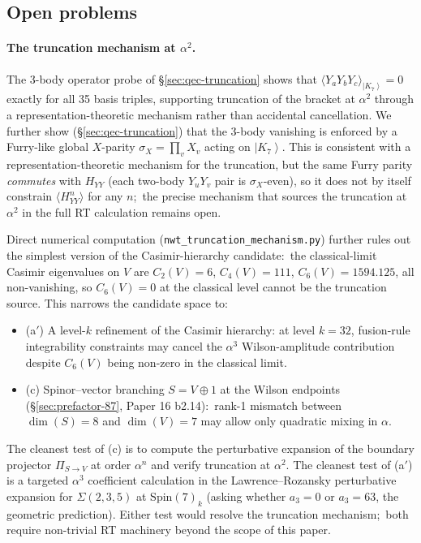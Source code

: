 \documentclass[11pt]{article}
\newcommand{\Spin}{\mathrm{Spin}}
\newcommand{\ket}[1]{\left|#1\right\rangle}
\begin{document}
\subsection{Open problems}
\label{sec:open-problems}

\paragraph{The truncation mechanism at $\alpha^2$.}
The 3-body operator probe of \S\ref{sec:qec-truncation} shows that
$\langle Y_aY_bY_c\rangle_{\ket{K_7}} = 0$ exactly for all 35
basis triples, supporting truncation of the bracket at $\alpha^2$
through a representation-theoretic mechanism rather than accidental
cancellation.  We further show (\S\ref{sec:qec-truncation}) that
the 3-body vanishing is enforced by a Furry-like global $X$-parity
$\sigma_X = \prod_v X_v$ acting on $\ket{K_7}$.  This is consistent
with a representation-theoretic mechanism for the truncation, but
the same Furry parity \emph{commutes} with $H_{YY}$ (each two-body
$Y_uY_v$ pair is $\sigma_X$-even), so it does not by itself constrain
$\langle H_{YY}^n\rangle$ for any $n$;\ the precise mechanism that
sources the truncation at $\alpha^2$ in the full RT calculation
remains open.

Direct numerical computation
(\texttt{nwt\_truncation\_mechanism.py}) further rules out the
simplest version of the Casimir-hierarchy candidate:\ the
classical-limit Casimir eigenvalues on $V$ are $C_2(V) = 6$,
$C_4(V) = 111$, $C_6(V) = 1594.125$, all non-vanishing, so
$C_6(V) = 0$ at the classical level cannot be the truncation
source.  This narrows the candidate space to:

\begin{itemize}
\item (a$'$) A level-$k$ refinement of the Casimir hierarchy: at
  level $k = 32$, fusion-rule integrability constraints may cancel
  the $\alpha^3$ Wilson-amplitude contribution despite $C_6(V)$
  being non-zero in the classical limit.
\item (c) Spinor--vector branching $S = V \oplus 1$ at the Wilson
  endpoints (\S\ref{sec:prefactor-87}, Paper 16 b2.14):\ rank-1
  mismatch between $\dim(S) = 8$ and $\dim(V) = 7$ may allow only
  quadratic mixing in $\alpha$.
\end{itemize}

\noindent
The cleanest test of (c) is to compute the perturbative expansion of
the boundary projector $\Pi_{S\to V}$ at order $\alpha^n$ and verify
truncation at $\alpha^2$.  The cleanest test of (a$'$) is a targeted
$\alpha^3$ coefficient calculation in the Lawrence--Rozansky
perturbative expansion for $\Sigma(2,3,5)$ at $\Spin(7)_k$ (asking
whether $a_3 = 0$ or $a_3 = 63$, the geometric prediction).  Either
test would resolve the truncation mechanism;\ both require
non-trivial RT machinery beyond the scope of this paper.
\end{document}
